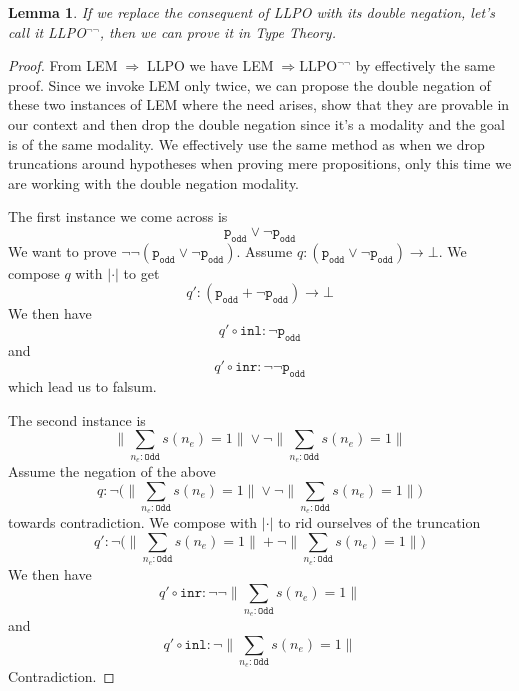 \documentclass[12pt]{report}
\newtheorem{lem}[thm]{Lemma}
\theoremstyle{definition}
\begin{document}
\begin{lem}\label{llponeg}
If we replace the consequent of LLPO with its double negation, let's call it LLPO$^{\neg\neg}$, then we can prove it in Type Theory. 
\end{lem}
\begin{proof}
From LEM$\;\Rightarrow\;$LLPO we have LEM$\;\Rightarrow$LLPO$^{\neg\neg}$ by effectively the same proof. 
Since we invoke LEM only twice, we can propose the double negation of these two instances of LEM where the need arises, show that they are provable in our context and then drop the double negation since it's a modality and the goal is of the same modality. 
We effectively use the same method as when we drop truncations around hypotheses when proving mere propositions, only this time we are working with the double negation modality. 

The first instance we come across is $$\mathtt{p_{odd}} \vee \neg \mathtt{p_{odd}}$$
We want to prove $\neg \neg (\mathtt{p_{odd}} \vee \neg \mathtt{p_{odd}})$. 
Assume $q: (\mathtt{p_{odd}} \vee \neg \mathtt{p_{odd}}) \rightarrow \bot$. 
We compose $q$ with $|\cdot|$ to get 
$$q': (\mathtt{p_{odd}} + \neg \mathtt{p_{odd}}) \rightarrow \bot$$
We then have 
$$q' \circ \mathtt{inl} : \neg\mathtt{p_{odd}}$$
and
$$q' \circ \mathtt{inr} : \neg\neg \mathtt{p_{odd}}$$
which lead us to falsum.

The second instance is 
$$\Big\lVert\sum_{n_e : \mathtt{Odd}}s(n_e)=1 \Big\rVert \vee \neg \Big\lVert\sum_{n_e : \mathtt{Odd}}s(n_e)=1 \Big\rVert$$
Assume the negation of the above 
$$q : \neg \bigg(\Big\lVert\sum_{n_e : \mathtt{Odd}}s(n_e)=1 \Big\rVert \vee \neg \Big\lVert\sum_{n_e : \mathtt{Odd}}s(n_e)=1 \Big\rVert\bigg)$$
towards contradiction. 
We compose with $|\cdot|$ to rid ourselves of the truncation
$$q' : \neg \bigg(\Big\lVert\sum_{n_e : \mathtt{Odd}}s(n_e)=1 \Big\rVert + \neg \Big\lVert\sum_{n_e : \mathtt{Odd}}s(n_e)=1 \Big\rVert\bigg)$$
We then have
$$q' \circ \mathtt{inr} : \neg \neg \Big\lVert\sum_{n_e : \mathtt{Odd}}s(n_e)=1 \Big\rVert$$
and
$$q' \circ \mathtt{inl} : \neg \Big\lVert\sum_{n_e : \mathtt{Odd}}s(n_e)=1 \Big\rVert$$
Contradiction.
\end{proof}
\end{document}
